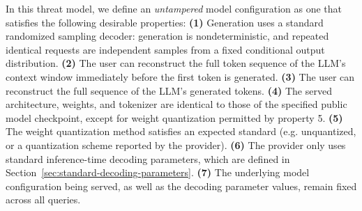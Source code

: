 \documentclass{article}
\begin{document}
In this threat model, we define an \emph{untampered} model configuration as one that satisfies the following desirable properties:
\noindent \textbf{(1)} Generation uses a standard randomized sampling decoder: generation is
nondeterministic, and repeated identical requests are independent samples
from a fixed conditional output distribution. \textbf{(2)} The user can reconstruct the
full token sequence of the LLM's context window immediately before the first
token is generated. \textbf{(3)} The user can reconstruct the full sequence of the LLM's
generated tokens. \textbf{(4)} The served architecture, weights, and tokenizer are
identical to those of the specified public model checkpoint, except for weight
quantization permitted by property 5. \textbf{(5)} The weight quantization method
satisfies an expected standard (e.g. unquantized, or a quantization scheme
reported by the provider). \textbf{(6)} The provider only uses standard inference-time
decoding parameters, which are defined in
Section~\ref{sec:standard-decoding-parameters}. \textbf{(7)} The underlying model
configuration being served, as well as the decoding parameter values, remain
fixed across all queries.
\end{document}
